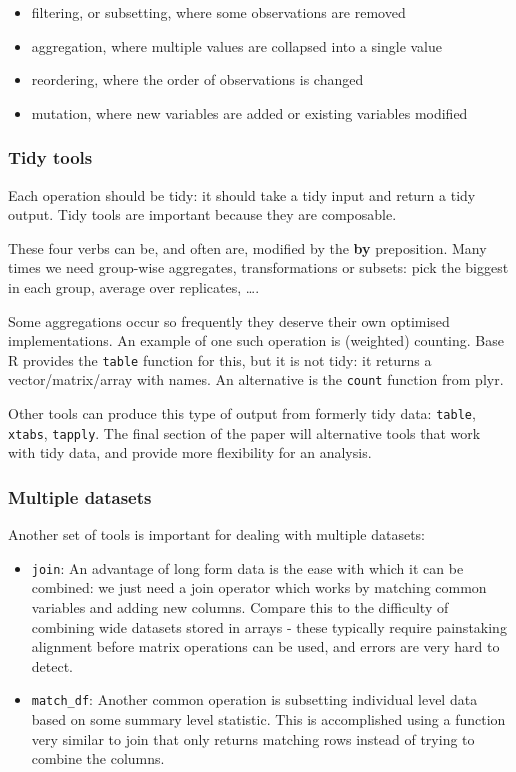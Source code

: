 \documentclass[oneside]{article}
\begin{document}
\begin{itemize}

\item filtering, or subsetting, where some observations are removed
\item aggregation, where multiple values are collapsed into a single value
\item reordering, where the order of observations is changed
\item mutation, where new variables are added or existing variables modified 

\end{itemize}

\subsubsection{Tidy tools}

Each operation should be tidy: it should take a tidy input and return a tidy output. Tidy tools are important because they are composable.

These four verbs can be, and often are, modified by the \textbf{by} preposition. Many times we need group-wise aggregates, transformations or subsets: pick the biggest in each group, average over replicates, \ldots.

Some aggregations occur so frequently they deserve their own optimised implementations. An example of one such operation is (weighted) counting. Base R provides the {\tt table} function for this, but it is not tidy: it returns a vector/matrix/array with names. An alternative is the {\tt count} function from plyr.

Other tools can produce this type of output from formerly tidy data: {\tt table}, {\tt xtabs}, {\tt tapply}. The final section of the paper will alternative tools that work with tidy data, and provide more flexibility for an analysis.

\subsubsection{Multiple datasets}

Another set of tools is important for dealing with multiple datasets: 

\begin{itemize}

\item {\tt join}: An advantage of long form data is the ease with which it can be combined: we just need a join operator which works by matching common variables and adding new columns. Compare this to the difficulty of combining wide datasets stored in arrays - these typically require painstaking alignment before matrix operations can be used, and errors are very hard to detect. 

\item {\tt match\_df}: Another common operation is subsetting individual level data based on some summary level statistic. This is accomplished using a function very similar to join that only returns matching rows instead of trying to combine the columns.

\end{itemize}
\end{document}
